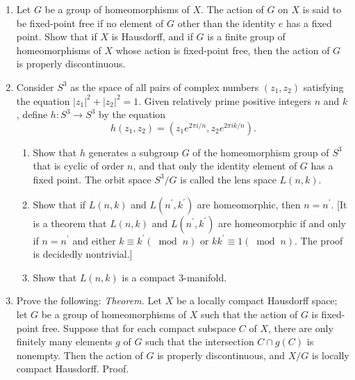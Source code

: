 \begin{enumerate}[itemsep=0.4em, parsep=0pt, topsep=0pt, partopsep=0pt, leftmargin=*, label=\arabic*., ref=\arabic*]
\begin{enumerate}[itemsep=0.2em, parsep=0pt, topsep=0pt, partopsep=0pt, leftmargin=*, label=(\alph*), align=left]
\par\nopagebreak
\begin{center}
	\label{fig:81.7_comm}
\end{center}
\par\nopagebreak
 \end{enumerate}
\item Let \(G\) be a group of homeomorphisms of \(X\). The action of \(G\) on \(X\) is said to be fixed-point free if no element of \(G\) other than the identity \(e\) has a fixed point. Show that if \(X\) is Hausdorff, and if \(G\) is a finite group of homeomorphisms of \(X\) whose action is fixed-point free, then the action of \(G\) is properly discontinuous.
\item Consider \(S^{3}\) as the space of all pairs of complex numbers \(( {z_{1},z_{2}})\) satisfying the equation \({| z_{1}| }^{2} + {| z_{2}| }^{2} = 1\). Given relatively prime positive integers \(n\) and \(k\), define \(h : S^{3} \rightarrow {S}^{3}\) by the equation \[ h( {z_{1},z_{2}}) = ( {z_{1}e^{{2\pi i}/n},z_{2}e^{{2\pi ik}/n}}). \]
 \begin{enumerate}[itemsep=0.2em, parsep=0pt, topsep=0pt, partopsep=0pt, leftmargin=*, label=(\alph*), align=left]
 \item Show that \(h\) generates a subgroup \(G\) of the homeomorphism group of \(S^{3}\) that is cyclic of order \(n\), and that only the identity element of \(G\) has a fixed point. The orbit space \(S^{3}/G\) is called the lens space \(L( {n,k})\).
 \item Show that if \(L( {n,k})\) and \(L( {n^{\prime },k^{\prime }})\) are homeomorphic, then \(n = n^{\prime }\). [It is a theorem that \(L( {n,k})\) and \(L( {n^{\prime },k^{\prime }})\) are homeomorphic if and only if \(n = n^{\prime }\) and either \(k \equiv {k}^{\prime }( {\;\operatorname{mod}\;n})\) or \(kk^{\prime } \equiv 1( {\;\operatorname{mod}\;n})\). The proof is decidedly nontrivial.]
 \item Show that \(L( {n,k})\) is a compact 3-manifold.
 \end{enumerate}
\item Prove the following: \textsl{Theorem.} Let \(X\) be a locally compact Hausdorff space; let \(G\) be a group of homeomorphisms of \(X\) such that the action of \(G\) is fixed-point free. Suppose that for each compact subspace \(C\) of \(X\), there are only finitely many elements \(g\) of \(G\) such that the intersection \(C \cap g( C)\) is nonempty. Then the action of \(G\) is properly discontinuous, and \(X/G\) is locally compact Hausdorff. Proof.

\end{enumerate}
